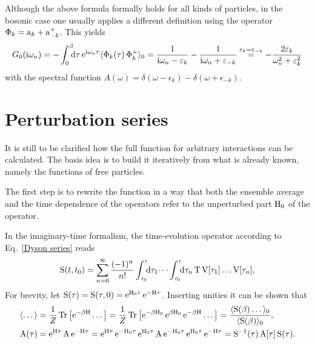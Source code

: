 Although the above formula formally holds for all kinds of particles, in the
bosonic case one usually applies a different definition using the operator
$\Phi_k = \mathrm a_k + \mathrm a_{-k}^+$. This yields
%
\begin{equation*}
    G_0(\I \omega_n) = -\int \from 0 \till \beta \D \tau \,
    \E^{\I \omega_n \tau} \av{\op \Phi_k(\tau) \, \op \Phi_k^+}_0
    = \frac 1 {\I \omega_n - \epsilon_k} - \frac 1 {\I \omega_n + \epsilon_{-k}}
    \overset{\epsilon_k = \epsilon_{-k}} =
    -\frac{2 \epsilon_k}{\omega_n^2 + \epsilon_k^2}
\end{equation*}
%
with the spectral function $A(\omega) = \delta(\omega - \epsilon_k) -
\delta(\omega + \epsilon_{-k})$.

\section{Perturbation series}

It is still to be clarified how the full  function for arbitrary
interactions can be calculated. The basis idea is to build it iteratively from
what is already known, namely the  functions of free particles.

The first step is to rewrite the  function in a way that both the
ensemble average and the time dependence of the operators refer to the
unperturbed part $\mathrm H_0$ of the  operator.

In the imaginary-time formalism, the time-evolution operator according to
Eq.~\ref{Dyson series} reads
%
\begin{equation} \label{Matsubara-Dyson series}
    \op S(t, t_0) = \sum_{n = 0}^\infty \frac{(-1)^n}{n!}
    \int \from{\tau_0} \till \tau \D \tau_1 \dots
    \int \from{\tau_0} \till \tau \D \tau_n \,
    \op T \, \op V[\tau_1] \dots \op V[\tau_n],
\end{equation}
%
For brevity, let $\mathrm S(\tau) = \mathrm S(\tau, 0) = \mathrm e^{\mathrm H_0 \tau} \, \mathrm e^{-\mathrm H
\tau}$. Inserting unities it can be shown that
%
\begin{align*}
    \langle\dots\rangle &= \frac 1 Z \operatorname{Tr} \big[ \mathrm e^{-\beta \mathrm H} \dots \big]
    = \frac 1 Z \operatorname{Tr} \big[
        \mathrm e^{-\beta \mathrm H_0} \, \mathrm e^{\beta \mathrm H_0} \, \mathrm e^{-\beta \mathrm H} \dots
    \big]
    = \frac{\langle\mathrm S(\beta) \dots\rangle_0}{\langle\mathrm S(\beta)\rangle_0},
    \\
    \mathrm A(\tau) &= \mathrm e^{\mathrm H \tau} \, \mathrm A \, \mathrm e^{-\mathrm H \tau}
    = \mathrm e^{\mathrm H \tau} \, \mathrm e^{-\mathrm H_0 \tau} \,
    \mathrm e^{\mathrm H_0 \tau} \, \mathrm A \, \mathrm e^{-\mathrm H_0 \tau} \,
    \mathrm e^{\mathrm H_0 \tau} \, \mathrm e^{-\mathrm H \tau}
    = \mathrm S^{-1}(\tau) \, \mathrm A[\tau] \, \mathrm S(\tau).
\end{align*}

